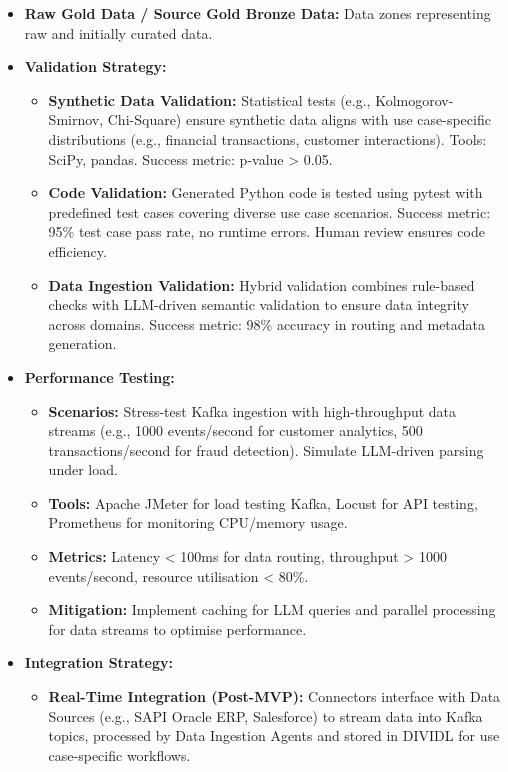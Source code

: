 \documentclass{article}
\begin{document}
\begin{itemize}
    \item \textbf{Raw Gold Data / Source Gold Bronze Data:} Data zones representing raw and initially curated data.
    \item \textbf{Validation Strategy:}
        \begin{itemize}
            \item \textbf{Synthetic Data Validation:} Statistical tests (e.g., Kolmogorov-Smirnov, Chi-Square) ensure synthetic data aligns with use case-specific distributions (e.g., financial transactions, customer interactions). Tools: SciPy, pandas. Success metric: p-value > 0.05.
            \item \textbf{Code Validation:} Generated Python code is tested using pytest with predefined test cases covering diverse use case scenarios. Success metric: 95\% test case pass rate, no runtime errors. Human review ensures code efficiency.
            \item \textbf{Data Ingestion Validation:} Hybrid validation combines rule-based checks with LLM-driven semantic validation to ensure data integrity across domains. Success metric: 98\% accuracy in routing and metadata generation.
        \end{itemize}
    \item \textbf{Performance Testing:}
        \begin{itemize}
            \item \textbf{Scenarios:} Stress-test Kafka ingestion with high-throughput data streams (e.g., 1000 events/second for customer analytics, 500 transactions/second for fraud detection). Simulate LLM-driven parsing under load.
            \item \textbf{Tools:} Apache JMeter for load testing Kafka, Locust for API testing, Prometheus for monitoring CPU/memory usage.
            \item \textbf{Metrics:} Latency < 100ms for data routing, throughput > 1000 events/second, resource utilisation < 80\%.
            \item \textbf{Mitigation:} Implement caching for LLM queries and parallel processing for data streams to optimise performance.
        \end{itemize}
    \item \textbf{Integration Strategy:}
        \begin{itemize}
            \item \textbf{Real-Time Integration (Post-MVP):} Connectors interface with Data Sources (e.g., SAPI Oracle ERP, Salesforce) to stream data into Kafka topics, processed by Data Ingestion Agents and stored in DIVIDL for use case-specific workflows.

\end{itemize}
\end{itemize}
\end{document}
